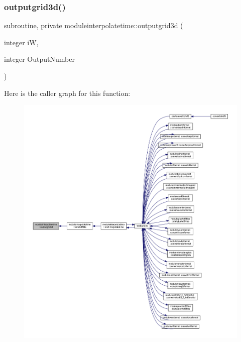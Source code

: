 \subsubsection{\texorpdfstring{outputgrid3d()}{outputgrid3d()}}
{\footnotesize\ttfamily subroutine, private moduleinterpolatetime\+::outputgrid3d (\begin{DoxyParamCaption}\item[{integer}]{iW,  }\item[{integer}]{Output\+Number }\end{DoxyParamCaption})\hspace{0.3cm}{\ttfamily [private]}}

Here is the caller graph for this function\+:\nopagebreak
\begin{figure}[H]
\begin{center}
\leavevmode
\includegraphics[width=350pt]{namespacemoduleinterpolatetime_a0a16c53d72886b47809d200696776b0c_icgraph}
\end{center}
\end{figure}
\mbox{\label{namespacemoduleinterpolatetime_a74dbf441733e6031ead9d8056ffa421f}} 
